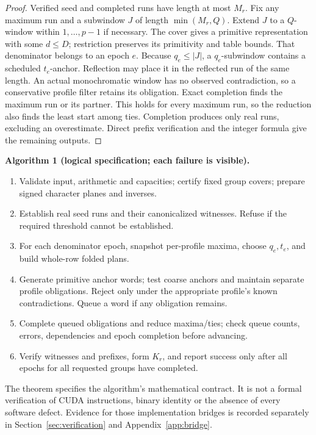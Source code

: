 \documentclass[11pt]{article}
\theoremstyle{definition}\newtheorem{remark}[theorem]{Remark}
\begin{document}
\begin{proof}
Verified seed and completed runs have length at most $M_r$. Fix any
maximum run and a subwindow $J$ of length $\min(M_r,Q)$. Extend $J$ to
a $Q$-window within $1,\ldots,p-1$ if necessary. The cover gives a
primitive representation with some $d\le D$; restriction preserves its
primitivity and table bounds. That denominator belongs to an epoch $e$.
Because $q_e\le |J|$, a $q_e$-subwindow contains a scheduled $t_e$-anchor.
Reflection may place it in the reflected run of the same length.
An actual monochromatic window has no observed contradiction, so a
conservative profile filter retains its obligation. Exact completion finds
the maximum run or its partner. This holds for every maximum run, so the
reduction also finds the least start among ties. Completion produces only
real runs, excluding an overestimate. Direct prefix verification and the
integer formula give the remaining outputs.
\end{proof}

\noindent\textbf{Algorithm 1 (logical specification; each failure is visible).}
\begin{enumerate}
\setlength{\itemsep}{1pt}
\item Validate input, arithmetic and capacities; certify fixed group covers;
prepare signed character planes and inverses.
\item Establish real seed runs and their canonicalized witnesses. Refuse
if the required threshold cannot be established.
\item For each denominator epoch, snapshot per-profile maxima, choose
$q_e,t_e$, and build whole-row folded plans.
\item Generate primitive anchor words; test coarse anchors and maintain
separate profile obligations. Reject only under the appropriate profile's
known contradictions. Queue a word if any obligation remains.
\item Complete queued obligations and reduce maxima/ties; check queue
counts, errors, dependencies and epoch completion before advancing.
\item Verify witnesses and prefixes, form $K_r$, and report success only
after all epochs for all requested groups have completed.
\end{enumerate}
The theorem specifies the algorithm's mathematical contract. It is not a
formal verification of CUDA instructions, binary identity or the absence
of every software defect. Evidence for those implementation bridges is
recorded separately in Section~\ref{sec:verification} and Appendix~\ref{app:bridge}.
\end{document}
